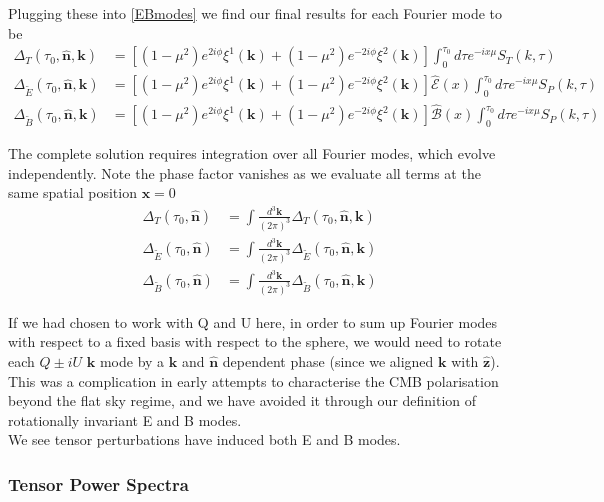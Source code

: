 \documentclass[a4paper,10pt]{article}
\renewcommand{\v}[1]{\mathbf{#1}}
\newcommand{\fint}[1]{\int \frac{d^3 \v{#1}}{(2\pi)^3}}
\newcommand{\unit}[1]{\hat{\v{#1}}}
\begin{document}
Plugging these into \ref{EBmodes} we find our final results for each Fourier mode to be
\begin{equation}\begin{split}
\Delta_T(\tau_0,\unit{n},\v{k}) &= [(1-\mu^2) e^{2i\phi} \xi^1(\v{k})+(1-\mu^2) e^{-2i\phi} \xi^2(\v{k})]\int_0^{\tau_0}d\tau e^{-ix\mu}S_T(k,\tau)\\
\Delta_{\tilde{E}}(\tau_0,\unit{n},\v{k}) &= [(1-\mu^2) e^{2i\phi} \xi^1(\v{k})+(1-\mu^2) e^{-2i\phi} \xi^2(\v{k})]\hat{\mathcal{E}}(x)\int_0^{\tau_0}d\tau e^{-ix\mu}S_P(k,\tau)\\
\Delta_{\tilde{B}}(\tau_0,\unit{n},\v{k}) &= [(1-\mu^2) e^{2i\phi} \xi^1(\v{k})+(1-\mu^2) e^{-2i\phi} \xi^2(\v{k})]\hat{\mathcal{B}}(x)\int_0^{\tau_0}d\tau e^{-ix\mu}S_P(k,\tau)
\label{LoSFourier}
\end{split}\end{equation}

The complete solution requires integration over all Fourier modes, which evolve independently. Note the phase factor vanishes as we evaluate all terms at the same spatial position $\v{x}=0$ 
\begin{equation}\begin{split}
\Delta_T(\tau_0,\unit{n}) &= \fint{k} \Delta_T(\tau_0,\unit{n},\v{k})\\
\Delta_{\tilde{E}}(\tau_0,\unit{n}) &= \fint{k} \Delta_{\tilde{E}}(\tau_0,\unit{n},\v{k})\\
\Delta_{\tilde{B}}(\tau_0,\unit{n}) &= \fint{k} \Delta_{\tilde{B}}(\tau_0,\unit{n},\v{k})
\end{split}\end{equation}

If we had chosen to work with Q and U here, in order to sum up Fourier modes with respect to a fixed basis with respect to the sphere, we would need to rotate each $Q\pm iU$ $\v{k}$ mode by a $\v{k}$ and $\unit{n}$ dependent phase (since we aligned $\v{k}$ with $\unit{z}$). This was a complication in early attempts to characterise the CMB polarisation beyond the flat sky regime, and we have avoided it through our definition of rotationally invariant E and B modes.\\

We see tensor perturbations have induced both E and B modes.

\subsubsection{Tensor Power Spectra}
\end{document}
